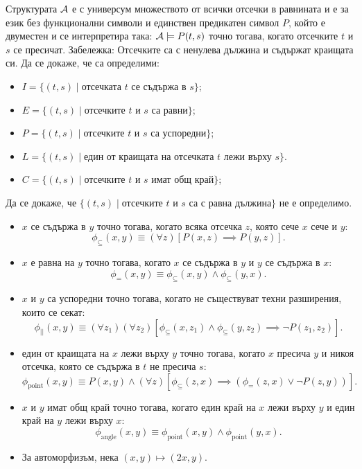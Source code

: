 \begin{problem}
  Структурата $\mathcal{A}$ е с универсум множеството от всички отсечки в равнината и е за език без функционални символи и
  единствен предикатен символ $P$, който е двуместен и се интерпретира така:
  $\mathcal{A} \models P(t,s)$ точно тогава, когато отсечките $t$ и $s$ се пресичат.
  Забележка: Отсечките са с ненулева дължина и съдържат краищата си.
  Да се докаже, че са определими:
\begin{itemize}
\item
  $I = \{(t, s) \mid \text{отсечката $t$ се съдържа в $s$}\}$;
\item
  $E = \{(t,s) \mid \text{отсечките $t$ и $s$ са равни}\}$;
\item
  $P = \{(t,s) \mid \text{отсечките $t$ и $s$ са успоредни}\}$;
\item
  $L = \{(t, s) \mid \text{един от краищата на отсечката $t$ лежи върху $s$}\}$.
\item
  $C = \{(t, s) \mid \text{отсечките $t$ и $s$ имат общ край}\}$;
\end{itemize}
Да се докаже, че $\{(t, s) \mid \text{отсечките $t$ и $s$ са с равна дължина}\}$ не е определимо.
\end{problem}
\begin{solution}
  \begin{itemize}
  \item
    $x$ се съдържа в $y$ точно тогава, когато всяка отсечка $z$, която сече $x$ сече и $y$:
    \[\phi_{\subseteq}(x,y) \equiv (\forall z)[P(x,z) \implies P(y,z)].\]
  \item
    $x$ е равна на $y$ точно тогава, когато $x$ се съдържа в $y$ и $y$ се съдържа в $x$:
    \[\phi_{=}(x,y) \equiv \phi_{\subseteq}(x,y) \land \phi_{\subseteq}(y,x).\]
  \item
    $x$ и $y$ са успоредни точно тогава, когато не съществуват техни разширения, които се секат:
    \[\phi_{||}(x,y) \equiv (\forall z_1)(\forall z_2)[\phi_{\subseteq}(x,z_1) \land \phi_{\subseteq}(y,z_2) \implies \neg P(z_1,z_2)].\]
  \item
    един от краищата на $x$ лежи върху $y$ точно тогава, когато $x$ пресича $y$ и никоя
    отсечка, която се съдържа в $t$ не пресича $s$:
    \[\phi_{\text{point}}(x,y) \equiv P(x,y) \land (\forall z)[\phi_{\subseteq}(z,x) \implies (\phi_{=}(z,x) \lor \neg P(z,y))].\]
  \item
    $x$ и $y$ имат общ край точно тогава, когато един край на $x$ лежи върху $y$ и един край на $y$ лежи върху $x$:
    \[\phi_{\text{angle}}(x,y) \equiv \phi_{\text{point}}(x,y) \land \phi_{\text{point}}(y,x).\]
  \item
    За автоморфизъм, нека $(x,y) \mapsto (2x,y)$.
  \end{itemize}
\end{solution}


